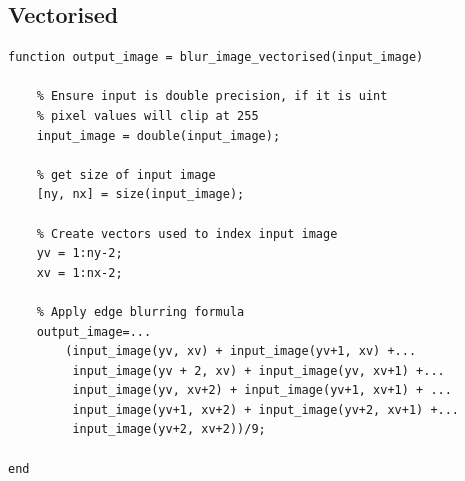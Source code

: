 \subsection{Vectorised}
\begin{minipage}{\textwidth}
\begin{lstlisting}
function output_image = blur_image_vectorised(input_image) 

    % Ensure input is double precision, if it is uint
    % pixel values will clip at 255
    input_image = double(input_image);

    % get size of input image
    [ny, nx] = size(input_image); 

    % Create vectors used to index input image
    yv = 1:ny-2; 
    xv = 1:nx-2; 

    % Apply edge blurring formula
    output_image=...
        (input_image(yv, xv) + input_image(yv+1, xv) +... 
         input_image(yv + 2, xv) + input_image(yv, xv+1) +... 
         input_image(yv, xv+2) + input_image(yv+1, xv+1) + ...
         input_image(yv+1, xv+2) + input_image(yv+2, xv+1) +...
         input_image(yv+2, xv+2))/9;

end
\end{lstlisting}
\end{minipage}




